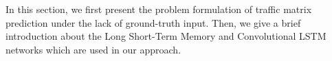 In this section, we first present the problem formulation of traffic matrix prediction under the lack of ground-truth input. 
Then, we give a brief introduction about the Long Short-Term Memory and Convolutional LSTM networks which are used in our approach. 

